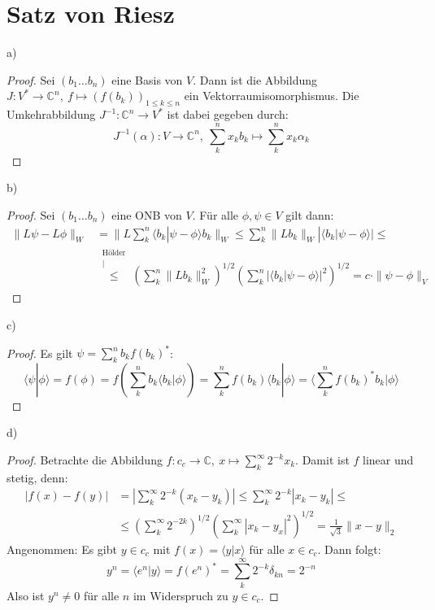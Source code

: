 \documentclass[a4paper,12pt]{article}
\newcommand{\kom}{}
\newcommand{\brak}{}
\newcommand{\kla}{}
\begin{document}
\section{Satz von Riesz}
a)
\begin{proof}
Sei $\kla\left( {b_1\dots b_n} \right)$ eine Basis von $V$. Dann ist die Abbildung $J:V^\ast\rightarrow\mathbb{C}^n,\ f\mapsto \kla\left( {f(b_k)} \right)_{1\le k\le n}$ ein Vektorraumisomorphismus. Die Umkehrabbildung $J^{-1}:\mathbb{C}^n\rightarrow V^\ast$ ist dabei gegeben durch:
$$J^{-1}(\alpha):V\rightarrow\mathbb{C}^n,\ \sum_k^nx_kb_k\mapsto\sum_k^nx_k\alpha_k$$
\end{proof}
b)
\begin{proof}
Sei $\kla\left( {b_1\dots b_n} \right)$ eine ONB von $V$. Für alle $\phi,\psi\in V$ gilt dann:
\begin{align*}
\|L\psi-L\phi\|_W&=\|L\sum_k^n\brak\langle {b_k}| {\psi-\phi}\rangle b_k\|_W\le\sum_k^n\|Lb_k\|_W|\brak\langle {b_k}| {\psi-\phi}\rangle|\le \\
&\kom\overset{\substack{{\text{Hölder}} \\ |}}{\le}\kla\left( {\sum_k^n\|Lb_k\|_W^2} \right)^{1/2}\kla\left( {\sum_k^n|\brak\langle {b_k}| {\psi-\phi}\rangle|^2} \right)^{1/2}=c\cdot \|\psi-\phi\|_V 
\end{align*}
\end{proof}
c)
\begin{proof}
Es gilt $\psi=\sum_k^n b_k f(b_k)^\ast$:
$$\brak\langle {\psi}| {\phi}\rangle=f(\phi)=f\kla\left( {\sum_k^n b_k\brak\langle {b_k}| {\phi}\rangle} \right)=\sum_k^n f(b_k)\brak\langle {b_k}| {\phi}\rangle=\brak\langle {\sum_k^n f(b_k)^\ast b_k}| {\phi}\rangle$$
\end{proof}
d)
\begin{proof}
Betrachte die Abbildung $f:c_c\rightarrow\mathbb{C},\ x\mapsto\sum_k^\infty 2^{-k}x_k$. Damit ist $f$ linear und stetig, denn:
\begin{align*}
|f(x)-f(y)|&=|\sum_k^\infty 2^{-k}(x_k-y_k)|\le\sum_k^\infty 2^{-k}|x_k-y_k|\le\\
&\le \kla\left( {\sum_k^\infty 2^{-2k}} \right)^{1/2}\kla\left( {\sum_k^\infty |x_k-y_x|^2} \right)^{1/2}=\frac{1}{\sqrt{3}}\|x-y\|_2
\end{align*}
Angenommen: Es gibt $y\in c_c$ mit $f(x)=\brak\langle {y}| {x}\rangle$ für alle $x\in c_c$. Dann folgt:
$$y^n=\brak\langle {e^n}| {y}\rangle=f(e^n)^\ast=\sum_k^\infty 2^{-k}\delta_{kn}=2^{-n}$$
Also ist $y^n\neq 0$ für alle $n$ im Widerspruch zu $y\in c_c$.
\end{proof}
\end{document}
